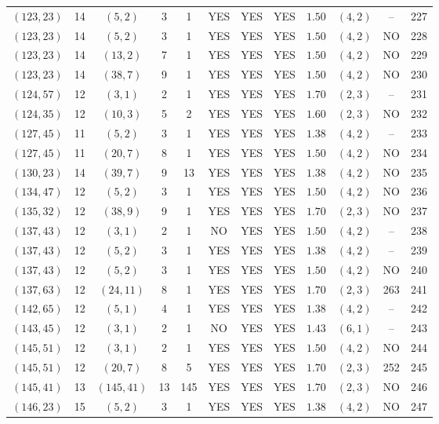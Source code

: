 \begin{longtable}{|c|c|c|c|c|c|c|c|c|c|c|c|}
$(123,23)$ & 14 & $(5,2)$ & 3 & 1 & YES & YES & YES & $1.50$ & $(4,2)$ & -- & 227\\
$(123,23)$ & 14 & $(5,2)$ & 3 & 1 & YES & YES & YES & $1.50$ & $(4,2)$ & NO & 228\\
$(123,23)$ & 14 & $(13,2)$ & 7 & 1 & YES & YES & YES & $1.50$ & $(4,2)$ & NO & 229\\
$(123,23)$ & 14 & $(38,7)$ & 9 & 1 & YES & YES & YES & $1.50$ & $(4,2)$ & NO & 230\\
$(124,57)$ & 12 & $(3,1)$ & 2 & 1 & YES & YES & YES & $1.70$ & $(2,3)$ & -- & 231\\
$(124,35)$ & 12 & $(10,3)$ & 5 & 2 & YES & YES & YES & $1.60$ & $(2,3)$ & NO & 232\\
$(127,45)$ & 11 & $(5,2)$ & 3 & 1 & YES & YES & YES & $1.38$ & $(4,2)$ & -- & 233\\
$(127,45)$ & 11 & $(20,7)$ & 8 & 1 & YES & YES & YES & $1.50$ & $(4,2)$ & NO & 234\\
$(130,23)$ & 14 & $(39,7)$ & 9 & 13 & YES & YES & YES & $1.38$ & $(4,2)$ & NO & 235\\
$(134,47)$ & 12 & $(5,2)$ & 3 & 1 & YES & YES & YES & $1.50$ & $(4,2)$ & NO & 236\\
$(135,32)$ & 12 & $(38,9)$ & 9 & 1 & YES & YES & YES & $1.70$ & $(2,3)$ & NO & 237\\
$(137,43)$ & 12 & $(3,1)$ & 2 & 1 & NO & YES & YES & $1.50$ & $(4,2)$ & -- & 238\\
$(137,43)$ & 12 & $(5,2)$ & 3 & 1 & YES & YES & YES & $1.38$ & $(4,2)$ & -- & 239\\
$(137,43)$ & 12 & $(5,2)$ & 3 & 1 & YES & YES & YES & $1.50$ & $(4,2)$ & NO & 240\\
$(137,63)$ & 12 & $(24,11)$ & 8 & 1 & YES & YES & YES & $1.70$ & $(2,3)$ & 263 & 241\\
$(142,65)$ & 12 & $(5,1)$ & 4 & 1 & YES & YES & YES & $1.38$ & $(4,2)$ & -- & 242\\
$(143,45)$ & 12 & $(3,1)$ & 2 & 1 & NO & YES & YES & $1.43$ & $(6,1)$ & -- & 243\\
$(145,51)$ & 12 & $(3,1)$ & 2 & 1 & YES & YES & YES & $1.50$ & $(4,2)$ & NO & 244\\
$(145,51)$ & 12 & $(20,7)$ & 8 & 5 & YES & YES & YES & $1.70$ & $(2,3)$ & 252 & 245\\
$(145,41)$ & 13 & $(145,41)$ & 13 & 145 & YES & YES & YES & $1.70$ & $(2,3)$ & NO & 246\\
$(146,23)$ & 15 & $(5,2)$ & 3 & 1 & YES & YES & YES & $1.38$ & $(4,2)$ & NO & 247\\

\end{longtable}
